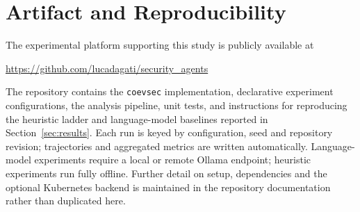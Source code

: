 \section{Artifact and Reproducibility}
\label{app:repro}

The experimental platform supporting this study is publicly available at
\begin{center}
\url{https://github.com/lucadagati/security_agents}
\end{center}
The repository contains the \texttt{coevsec} implementation, declarative
experiment configurations, the analysis pipeline, unit tests, and
instructions for reproducing the heuristic ladder and language-model
baselines reported in Section~\ref{sec:results}. Each run is keyed by
configuration, seed and repository revision; trajectories and aggregated
metrics are written automatically. Language-model experiments require a
local or remote Ollama endpoint; heuristic experiments run fully offline.
Further detail on setup, dependencies and the optional Kubernetes backend
is maintained in the repository documentation rather than duplicated here.
